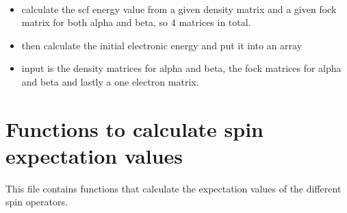 \documentclass[letterpaper,10pt,english]{sphinxmanual}
\begin{document}

\begin{fulllineitems}
\label{\detokenize{SCF_functions:hf.utilities.SCF_functions.uhf_scf_energy}}~\begin{itemize}
\item {} 
calculate the scf energy value from a given density matrix and a given fock matrix for both alpha and beta,
so 4 matrices in total.

\item {} 
then calculate the initial electronic energy and put it into an array

\item {} 
input is the density matrices for alpha and beta, the fock matrices for alpha and beta and lastly a one electron
matrix.

\end{itemize}

\end{fulllineitems}

\label{\detokenize{spin:module-hf.properties.spin}}

\chapter{Functions to calculate spin expectation values}
\label{\detokenize{spin:functions-to-calculate-spin-expectation-values}}\label{\detokenize{spin::doc}}
This file contains functions that calculate the expectation values of the different spin operators.
\end{document}
